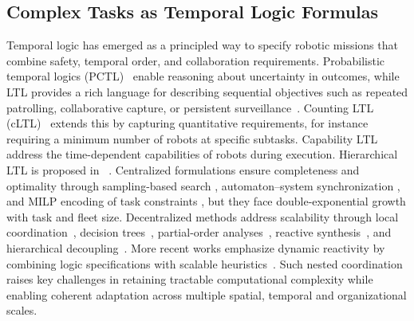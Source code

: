 \subsection{Complex Tasks as Temporal Logic Formulas}
Temporal logic has emerged as a principled way to specify robotic missions that
combine safety, temporal order, and collaboration requirements. Probabilistic
temporal logics (PCTL)~\cite{lahijanian2015temporal} enable reasoning about
uncertainty in outcomes, while LTL provides a rich language for describing
sequential objectives such as repeated patrolling, collaborative capture, or
persistent surveillance~\cite{kantaros2020stylus,  leahy2021scalable, schillinger2018simultaneous,
luo2021temporal}. Counting LTL (cLTL)~\cite{sahin2019multirobot}
extends this by capturing quantitative requirements, for instance requiring a
minimum number of robots at specific subtasks.
Capability LTL~\cite{li2025task,cardona2024planning} address the time-dependent capabilities of robots
during execution.
Hierarchical LTL is proposed in~\cite{luo2024decomposition} .
Centralized formulations ensure completeness and optimality through sampling-based search
\cite{kantaros2020stylus}, automaton–system synchronization
\cite{schillinger2018simultaneous}, and MILP encoding of task constraints
\cite{leahy2021scalable, luo2021temporal, sahin2019multirobot, kurtz2021more}, but they face
double-exponential growth with task and fleet size. Decentralized methods
address scalability through local coordination~\cite{lindemann2019coupled},
decision trees~\cite{chen2025real}, partial-order analyses~\cite{liu2024time},
reactive synthesis~\cite{kantaros2022perception}, and hierarchical decoupling~\cite{luo2025simultaneous}.
More recent works emphasize dynamic reactivity by combining logic
specifications with scalable heuristics~\cite{leahy2021scalable,chen2025real, cardona2024planning}.
Such nested coordination raises key challenges in retaining tractable
computational complexity while enabling coherent adaptation across multiple
spatial, temporal and organizational scales.

